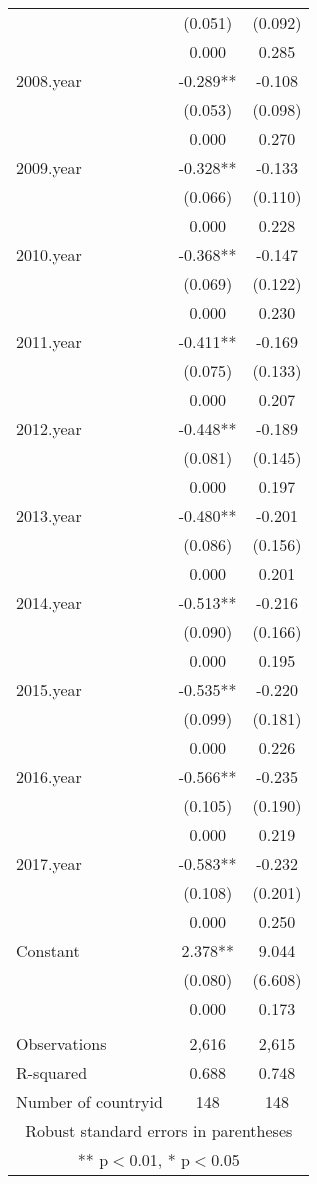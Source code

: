 \begin{tabular}{lcc}
 & (0.051) & (0.092) \\
 & 0.000 & 0.285 \\
2008.year & -0.289** & -0.108 \\
 & (0.053) & (0.098) \\
 & 0.000 & 0.270 \\
2009.year & -0.328** & -0.133 \\
 & (0.066) & (0.110) \\
 & 0.000 & 0.228 \\
2010.year & -0.368** & -0.147 \\
 & (0.069) & (0.122) \\
 & 0.000 & 0.230 \\
2011.year & -0.411** & -0.169 \\
 & (0.075) & (0.133) \\
 & 0.000 & 0.207 \\
2012.year & -0.448** & -0.189 \\
 & (0.081) & (0.145) \\
 & 0.000 & 0.197 \\
2013.year & -0.480** & -0.201 \\
 & (0.086) & (0.156) \\
 & 0.000 & 0.201 \\
2014.year & -0.513** & -0.216 \\
 & (0.090) & (0.166) \\
 & 0.000 & 0.195 \\
2015.year & -0.535** & -0.220 \\
 & (0.099) & (0.181) \\
 & 0.000 & 0.226 \\
2016.year & -0.566** & -0.235 \\
 & (0.105) & (0.190) \\
 & 0.000 & 0.219 \\
2017.year & -0.583** & -0.232 \\
 & (0.108) & (0.201) \\
 & 0.000 & 0.250 \\
Constant & 2.378** & 9.044 \\
 & (0.080) & (6.608) \\
 & 0.000 & 0.173 \\
 &  &  \\
Observations & 2,616 & 2,615 \\
R-squared & 0.688 & 0.748 \\
 Number of countryid & 148 & 148 \\ \hline
\multicolumn{3}{c}{ Robust standard errors in parentheses} \\
\multicolumn{3}{c}{ ** p$<$0.01, * p$<$0.05} \\
\end{tabular}
